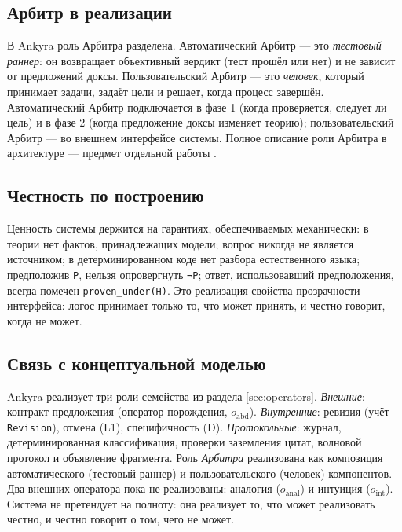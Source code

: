 \documentclass[12pt,a4paper]{article}
\begin{document}
\subsection{Арбитр в реализации}
\label{sec:arbiter_impl}

В Ankyra роль Арбитра разделена. Автоматический Арбитр --- это \emph{тестовый раннер}: он возвращает
объективный вердикт (тест прошёл или нет) и не зависит от предложений доксы. Пользовательский Арбитр
--- это \emph{человек}, который принимает задачи, задаёт цели и решает, когда процесс завершён.
Автоматический Арбитр подключается в фазе 1 (когда проверяется, следует ли цель) и в фазе 2
(когда предложение доксы изменяет теорию); пользовательский Арбитр — во внешнем интерфейсе системы.
Полное описание роли Арбитра в архитектуре — предмет отдельной работы \cite{ankyra_paper}.

\subsection{Честность по построению}
\label{sec:honesty}

Ценность системы держится на гарантиях, обеспечиваемых механически: в теории нет фактов, принадлежащих
модели; вопрос никогда не является источником; в детерминированном коде нет разбора естественного языка;
предположив \texttt{P}, нельзя опровергнуть \texttt{¬P}; ответ, использовавший предположения, всегда
помечен \texttt{proven\_under(H)}. Это реализация свойства прозрачности интерфейса: логос принимает
только то, что может принять, и честно говорит, когда не может.

\subsection{Связь с концептуальной моделью}
\label{sec:model_link}

Ankyra реализует три роли семейства из раздела \ref{sec:operators}. \emph{Внешние}: контракт предложения (оператор порождения,
$o_{\text{abd}}$). \emph{Внутренние}: ревизия (учёт \texttt{Revision}), отмена (L1), специфичность (D).
\emph{Протокольные}: журнал, детерминированная классификация, проверки заземления цитат, волновой протокол
и объявление фрагмента. Роль \emph{Арбитра} реализована как композиция автоматического (тестовый раннер)
и пользовательского (человек) компонентов. Два внешних оператора пока не реализованы: аналогия ($o_{\text{anal}}$)
и интуиция ($o_{\text{int}}$). Система не претендует на полноту: она реализует то, что может реализовать честно,
и честно говорит о том, чего не может.
\end{document}
